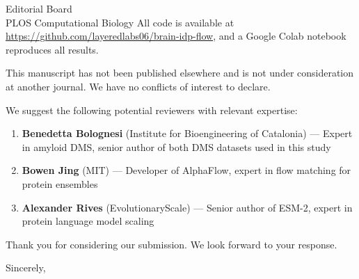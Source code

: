 \documentclass[11pt]{letter}
\begin{document}
\begin{letter}{Editorial Board \\ PLOS Computational Biology}
All code is available at \url{https://github.com/layeredlabs06/brain-idp-flow}, and a Google Colab notebook reproduces all results.

This manuscript has not been published elsewhere and is not under consideration at another journal. We have no conflicts of interest to declare.

We suggest the following potential reviewers with relevant expertise:

\begin{enumerate}
    \item \textbf{Benedetta Bolognesi} (Institute for Bioengineering of Catalonia) --- Expert in amyloid DMS, senior author of both DMS datasets used in this study
    \item \textbf{Bowen Jing} (MIT) --- Developer of AlphaFlow, expert in flow matching for protein ensembles
    \item \textbf{Alexander Rives} (EvolutionaryScale) --- Senior author of ESM-2, expert in protein language model scaling
\end{enumerate}

Thank you for considering our submission. We look forward to your response.

\closing{Sincerely,}

\end{letter}
\end{document}
